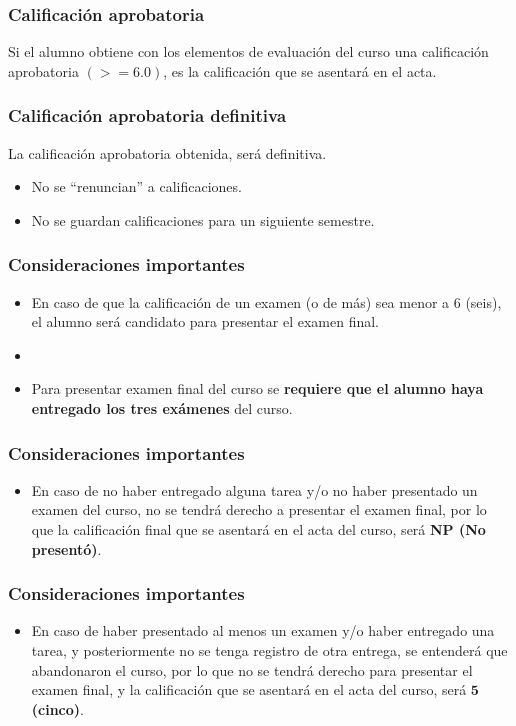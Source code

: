 \documentclass[12pt]{beamer}
\begin{document}
\begin{frame}
\frametitle{Calificación aprobatoria}
Si el alumno obtiene con los elementos de evaluación del curso una calificación aprobatoria $(>= 6.0)$, \pause es la calificación que se asentará en el acta.
\end{frame}
\begin{frame}
\frametitle{Calificación aprobatoria definitiva}
La calificación aprobatoria obtenida, será definitiva.
\begin{itemize}[<+->]
\setlength{\itemsep}{0mm}
\item No se \enquote{renuncian} a calificaciones.
\item No se guardan calificaciones para un siguiente semestre.
\end{itemize}
\end{frame}
\begin{frame}
\frametitle{Consideraciones importantes}
\begin{itemize}[<+->]
\setlength{\itemsep}{0mm}
\item En caso de que la calificación de un examen (o de más) sea menor a $6$ (seis), el alumno será candidato para presentar el examen final.
\item {}
\item Para presentar examen final del curso se \textbf{requiere que el alumno haya entregado los tres exámenes} del curso.
\end{itemize}
\end{frame}
\begin{frame}
\frametitle{Consideraciones importantes}
\begin{itemize}[<+->]
\setlength{\itemsep}{0mm}
\item En caso de no haber entregado alguna tarea y/o no haber presentado un examen del curso, no se tendrá derecho a presentar el examen final, por lo que la calificación final que se asentará en el acta del curso, será \textbf{NP (No presentó)}.
\end{itemize}
\end{frame}
\begin{frame}
\frametitle{Consideraciones importantes}
\begin{itemize}[<+->]
\setlength{\itemsep}{0mm}
\item En caso de haber presentado al menos un examen y/o haber entregado una tarea, y posteriormente no se tenga registro de otra entrega, se entenderá que abandonaron el curso, por lo que no se tendrá derecho para presentar el examen final, y la calificación que se asentará en el acta del curso, será $\mathbf{5}$ \textbf{(cinco)}.
\end{itemize}
\end{frame}
\end{document}
